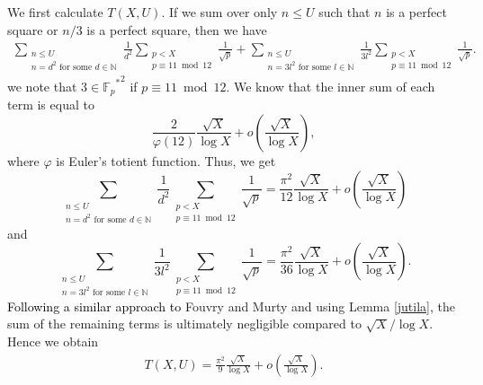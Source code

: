 \documentclass[a4paper, 11pt]{article}
\theoremstyle{plain}
\newcommand{\?}{\textcolor{red}{??}}
\newcommand{\fp}{\mathbb{F}_p}
\newcommand{\bN}{\mathbb{N}}
\begin{document}
We first calculate $T(X,U)$. If we sum over only $n \le U$ such that $n$ is a perfect square or $n/3$ is a perfect square, then we have 
    \begin{eqnarray*}
    \sum_{\substack{n \le U \\ n=d^2 \text{ for some } d \in \bN }} \frac{1}{d^2} \sum_{\substack{p<X \\ p \equiv 11 \bmod 12 }} \frac{1}{\sqrt{p}}+\sum_{\substack{n \le U \\ n=3l^2 \text{ for some } l \in \bN }} \frac{1}{3l^2} \sum_{\substack{p<X \\ p \equiv 11 \bmod 12}} \frac{1}{\sqrt{p}}.
    \end{eqnarray*}
we note that $3 \in {{\fp}^{*}}^2$ if $p \equiv 11 \bmod 12$. 
We know that the inner sum of each term is equal to
\[
\frac{2}{\varphi(12)} \frac{\sqrt{X}}{\log X} +o \left( \frac{\sqrt{X}}{\log X} \right),
\]
where $\varphi$ is Euler's totient function. 
Thus, we get
\[
 \sum_{\substack{n \le U \\ n=d^2 \text{ for some } d \in \bN }} \frac{1}{d^2} \sum_{\substack{p<X \\ p \equiv 11 \bmod 12 }} \frac{1}{\sqrt{p}}=\frac{{\pi}^2}{12} \frac{\sqrt{X}}{\log X} +o \left( \frac{\sqrt{X}}{\log X} \right)
\]
and
\[
\sum_{\substack{n \le U \\ n=3l^2 \text{ for some } l \in \bN }} \frac{1}{3l^2} \sum_{\substack{p<X \\ p \equiv 11 \bmod 12 }} \frac{1}{\sqrt{p}}=\frac{{\pi}^2}{36} \frac{\sqrt{X}}{\log X} +o \left( \frac{\sqrt{X}}{\log X} \right).
\]
\textcolor{black}{Following a similar approach to} Fouvry and Murty \cite[p.\ 92]{FM01} and using Lemma \ref{jutila}, the sum of the remaining terms is ultimately negligible compared to $\sqrt{X}/ \log X$.
Hence we obtain
\begin{eqnarray}
\label{11mod12}
    T(X,U)=\frac{{\pi}^2}{9} \frac{\sqrt{X}}{\log X} +o \left( \frac{\sqrt{X}}{\log X} \right).
\end{eqnarray}
\end{document}
